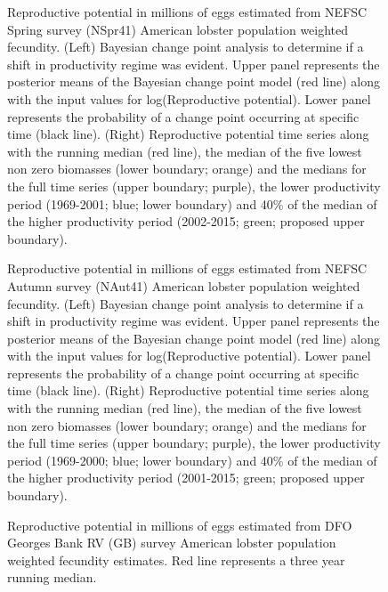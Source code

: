 \documentclass[11pt]{article}
\newcommand{\e}{/backup/bio_data/bio.lobster/figures/} %
\begin{document}
\begin{landscape}
\begin{figure}
\centering
    
\caption{Reproductive potential in millions of eggs estimated from NEFSC Spring survey (NSpr41) American lobster population weighted fecundity.  (Left) Bayesian change point analysis to determine if a shift in productivity regime was evident. Upper panel represents the posterior means of the Bayesian change point model (red line) along with the input values for log(Reproductive potential). Lower panel represents the probability of a change point occurring at specific time (black line). (Right) Reproductive potential time series along with the running median (red line), the median of the five lowest non zero biomasses (lower boundary; orange) and the medians for the full time series (upper boundary; purple), the lower productivity period (1969-2001; blue; lower boundary) and 40\% of the median of the higher productivity period (2002-2015; green; proposed upper boundary). }
\end{figure}
\end{landscape}


\begin{landscape}
\begin{figure}
\centering
    
\caption{Reproductive potential in millions of eggs estimated from NEFSC Autumn survey (NAut41) American lobster population weighted fecundity.  (Left) Bayesian change point analysis to determine if a shift in productivity regime was evident. Upper panel represents the posterior means of the Bayesian change point model (red line) along with the input values for log(Reproductive potential). Lower panel represents the probability of a change point occurring at specific time (black line). (Right) Reproductive potential time series along with the running median (red line), the median of the five lowest non zero biomasses (lower boundary; orange) and the medians for the full time series (upper boundary; purple), the lower productivity period (1969-2000; blue; lower boundary) and 40\% of the median of the higher productivity period (2001-2015; green; proposed upper boundary). }
\end{figure}
\end{landscape}

\begin{figure}

\centering
\caption{Reproductive potential in millions of eggs estimated from DFO Georges Bank RV (GB) survey American lobster population weighted fecundity estimates. Red line represents a three year running median. }
\end{figure}
\end{document}
